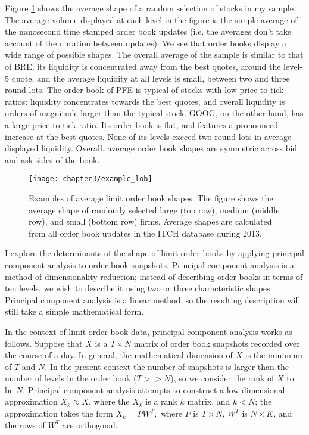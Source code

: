 	Figure \ref{fig:examples} shows the average shape of a random selection of stocks in my sample. The average volume displayed at each level in the figure is the simple average of the nanosecond time stamped order book updates (i.e. the averages don't take account of the duration between updates). We see that order books display a wide range of possible shapes. The overall average of the sample is similar to that of BRE; its liquidity is concentrated away from the best quotes, around the level-5 quote, and the average liquidity at all levels is small, between two and three round lots.  The order book of PFE is typical of stocks with low price-to-tick ratios: liquidity concentrates towards the best quotes, and overall liquidity is orders of magnitude larger than the typical stock. GOOG, on the other hand, has a large price-to-tick ratio. Its order book is flat, and features a pronounced increase at the best quotes. None of its levels exceed two round lots in average displayed liquidity. Overall, average order book shapes are symmetric across bid and ask sides of the book.

	\begin{figure}[p]
		\linespread{1}
		\centering
		\texttt{[image: chapter3/example\_lob]}
		\captionsetup{skip=-20pt, font=footnotesize, justification=justified, width=\linewidth}
		\caption[Examples of average limit order book shapes]{Examples of average limit order book shapes. The figure shows the average shape of randomly selected large (top row), medium (middle row), and small (bottom row) firms. Average shapes are calculated from all order book updates in the ITCH database during 2013.}
		\label{fig:examples}
	\end{figure}

	I explore the determinants of the shape of limit order books by applying principal component analysis to order book snapshots. Principal component analysis is a method of dimensionality reduction; instead of describing order books in terms of ten levels, we wish to describe it using two or three characteristic shapes. Principal component analysis is a linear method, so the resulting description will still take a simple mathematical form.

	In the context of limit order book data, principal component analysis works as follows. Suppose that $X$ is a $T \times N$ matrix of order book snapshots recorded over the course of a day. In general, the mathematical dimension of $X$ is the minimum of $T$ and $N$. In the present context the number of snapshots is larger than the number of levels in the order book ($T >> N$), so we consider the rank of $X$ to be $N$. Principal component analysis attempts to construct a low-dimensional approximation $X_k \approx X$, where the $X_k$ is a rank $k$ matrix, and $k < N$; the approximation takes the form $X_k = P W^T,$ where $P$ is $T \times N$, $W^T$ is $N \times K$, and the rows of $W^T$ are orthogonal.

